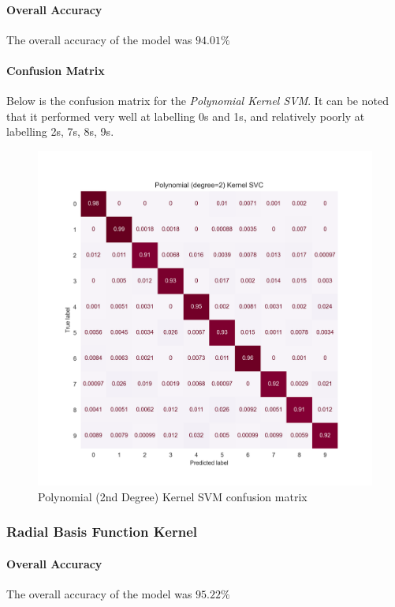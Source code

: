 \paragraph{Overall Accuracy} The overall accuracy of the model was $94.01\%$

\paragraph{Confusion Matrix} Below is the confusion matrix for the \textit{Polynomial Kernel SVM}. It can be noted that it performed very well at labelling 0s and 1s, and relatively poorly at labelling 2s, 7s, 8s, 9s.

\begin{figure}[h]
    \centering
    \includegraphics[scale=0.65]{images/exp-results/svm/svc_poly_conf-matrix.png}
    \caption{Polynomial (2nd Degree) Kernel SVM confusion matrix}
    \label{fig:exp_res_poly_svm_conf_mat}
\end{figure}

\subsubsection{Radial Basis Function Kernel}

\paragraph{Overall Accuracy} The overall accuracy of the model was $95.22\%$

